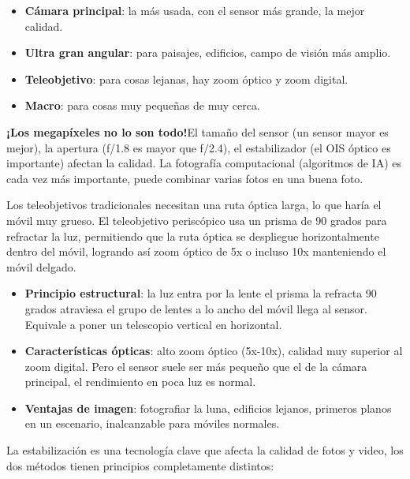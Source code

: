 \begin{itemize}
  \item \textbf{Cámara principal}: la más usada, con el sensor más grande, la mejor calidad.
  \item \textbf{Ultra gran angular}: para paisajes, edificios, campo de visión más amplio.
  \item \textbf{Teleobjetivo}: para cosas lejanas, hay zoom óptico y zoom digital.
  \item \textbf{Macro}: para cosas muy pequeñas de muy cerca.
\end{itemize}

\textbf{¡Los megapíxeles no lo son todo!}El tamaño del sensor (un sensor mayor es mejor), la apertura (f/1.8 es mayor que f/2.4), el estabilizador (el OIS óptico es importante) afectan la calidad. La fotografía computacional (algoritmos de IA) es cada vez más importante, puede combinar varias fotos en una buena foto.


Los teleobjetivos tradicionales necesitan una ruta óptica larga, lo que haría el móvil muy grueso. El teleobjetivo periscópico usa un prisma de 90 grados para refractar la luz, permitiendo que la ruta óptica se despliegue horizontalmente dentro del móvil, logrando así zoom óptico de 5x o incluso 10x manteniendo el móvil delgado.

\begin{itemize}
  \item \textbf{Principio estructural}: la luz entra por la lente el prisma la refracta 90 grados atraviesa el grupo de lentes a lo ancho del móvil llega al sensor. Equivale a poner un telescopio vertical en horizontal.
  \item \textbf{Características ópticas}: alto zoom óptico (5x-10x), calidad muy superior al zoom digital. Pero el sensor suele ser más pequeño que el de la cámara principal, el rendimiento en poca luz es normal.
  \item \textbf{Ventajas de imagen}: fotografiar la luna, edificios lejanos, primeros planos en un escenario, inalcanzable para móviles normales.
\end{itemize}


La estabilización es una tecnología clave que afecta la calidad de fotos y video, los dos métodos tienen principios completamente distintos:

